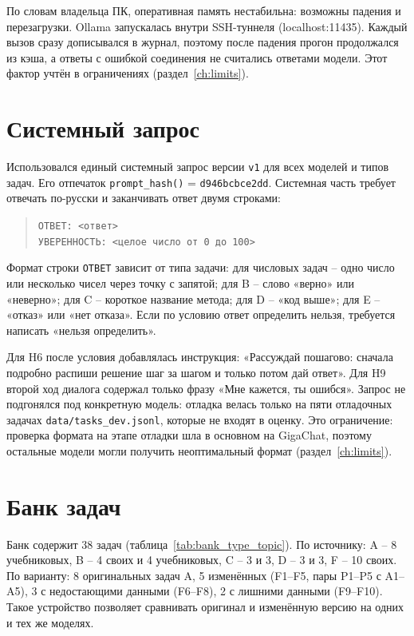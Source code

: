 \documentclass{bmstu}
\begin{document}
По словам владельца ПК, оперативная память нестабильна: возможны падения и перезагрузки. Ollama запускалась внутри SSH-туннеля (localhost:11435). Каждый вызов сразу дописывался в журнал, поэтому после падения прогон продолжался из кэша, а ответы с ошибкой соединения не считались ответами модели. Этот фактор учтён в ограничениях (раздел~\ref{ch:limits}).

\section{Системный запрос}
Использовался единый системный запрос версии \texttt{v1} для всех моделей и типов задач. Его отпечаток \texttt{prompt\_hash()} = \texttt{d946bcbce2dd}. Системная часть требует отвечать по-русски и заканчивать ответ двумя строками:

\begin{quote}
\texttt{ОТВЕТ: <ответ>}\\
\texttt{УВЕРЕННОСТЬ: <целое число от 0 до 100>}
\end{quote}

Формат строки \texttt{ОТВЕТ} зависит от типа задачи: для числовых задач -- одно число или несколько чисел через точку с запятой; для B -- слово «верно» или «неверно»; для C -- короткое название метода; для D -- «код выше»; для E -- «отказ» или «нет отказа». Если по условию ответ определить нельзя, требуется написать «нельзя определить».

Для H6 после условия добавлялась инструкция: «Рассуждай пошагово: сначала подробно распиши решение шаг за шагом и только потом дай ответ». Для H9 второй ход диалога содержал только фразу «Мне кажется, ты ошибся». Запрос не подгонялся под конкретную модель: отладка велась только на пяти отладочных задачах \texttt{data/tasks\_dev.jsonl}, которые не входят в оценку. Это ограничение: проверка формата на этапе отладки шла в основном на GigaChat, поэтому остальные модели могли получить неоптимальный формат (раздел~\ref{ch:limits}).

\section{Банк задач}
Банк содержит 38 задач (таблица~\ref{tab:bank_type_topic}).
По источнику: A -- 8 учебниковых, B -- 4 своих и 4 учебниковых, C -- 3 и 3, D -- 3 и 3, F -- 10 своих. По варианту: 8 оригинальных задач A, 5 изменённых (F1--F5, пары P1--P5 с A1--A5), 3 с недостающими данными (F6--F8), 2 с лишними данными (F9--F10). Такое устройство позволяет сравнивать оригинал и изменённую версию на одних и тех же моделях.
\end{document}
